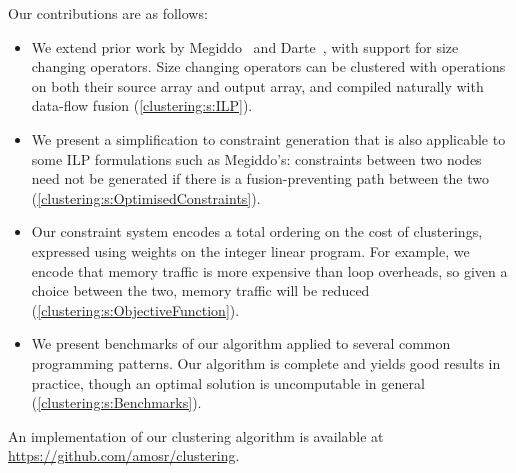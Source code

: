 Our contributions are as follows:
\begin{itemize}
\item   
We extend prior work by Megiddo~\cite{megiddo1998optimal} and Darte~\cite{darte2002contraction}, with support for size changing operators.
Size changing operators can be clustered with operations on both their source array and output array, and compiled naturally with data-flow fusion (\autoref{clustering:s:ILP}).

\item
We present a simplification to constraint generation that is also applicable to some ILP formulations such as Megiddo's:
constraints between two nodes need not be generated if there is a fusion-preventing path between the two (\autoref{clustering:s:OptimisedConstraints}).

\item
Our constraint system encodes a total ordering on the cost of clusterings, expressed using weights on the integer linear program.
For example, we encode that memory traffic is more expensive than loop overheads, so given a choice between the two, memory traffic will be reduced (\autoref{clustering:s:ObjectiveFunction}).

\item
We present benchmarks of our algorithm applied to several common programming patterns.
Our algorithm is complete and yields good results in practice, though an optimal solution is uncomputable in general (\autoref{clustering:s:Benchmarks}).
\end{itemize}

An implementation of our clustering algorithm is available at \url{https://github.com/amosr/clustering}.



